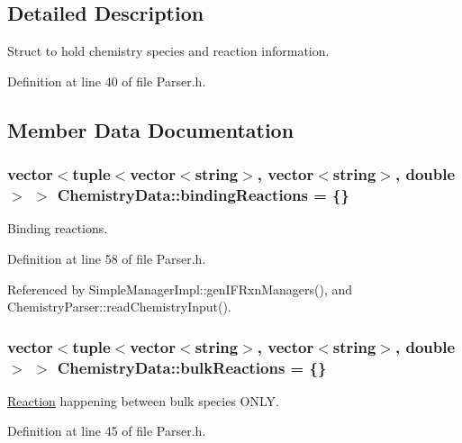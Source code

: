 \subsection{Detailed Description}
Struct to hold chemistry species and reaction information. 

Definition at line 40 of file Parser.\+h.



\subsection{Member Data Documentation}
\hypertarget{structChemistryData_aec9c915b7471596fa86d4c7ae2f0f8af}{
\subsubsection[{binding\+Reactions}]{\setlength{\rightskip}{0pt plus 5cm}vector$<$tuple$<$vector$<$string$>$, vector$<$string$>$, double$>$ $>$ Chemistry\+Data\+::binding\+Reactions = \{\}}}\label{structChemistryData_aec9c915b7471596fa86d4c7ae2f0f8af}


Binding reactions. 



Definition at line 58 of file Parser.\+h.



Referenced by Simple\+Manager\+Impl\+::gen\+I\+F\+Rxn\+Managers(), and Chemistry\+Parser\+::read\+Chemistry\+Input().

\hypertarget{structChemistryData_a18d2b4d3d417507768bb50f7f43f427b}{
\subsubsection[{bulk\+Reactions}]{\setlength{\rightskip}{0pt plus 5cm}vector$<$tuple$<$vector$<$string$>$, vector$<$string$>$, double$>$ $>$ Chemistry\+Data\+::bulk\+Reactions = \{\}}}\label{structChemistryData_a18d2b4d3d417507768bb50f7f43f427b}


\hyperlink{classReaction}{Reaction} happening between bulk species O\+N\+L\+Y. 



Definition at line 45 of file Parser.\+h.



